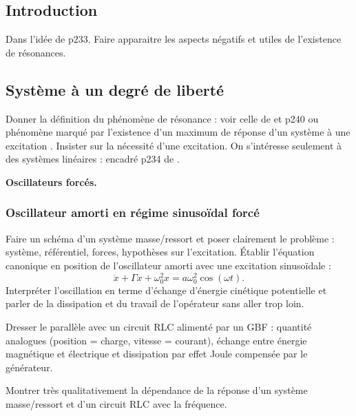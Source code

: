\subsection*{Introduction}

Dans l'idée de \cite{Michel2017} p233.
Faire apparaitre les aspects négatifs et utiles de l'existence de résonances.

\subsection{Système à un degré de liberté}

Donner la définition du phénomène de résonance : voir celle de \cite{Taillet2018} et \cite{Michel2017} p240 ou \og phénomène marqué par l'existence d'un maximum de réponse d'un système à une excitation \fg{}.
Insister sur la nécessité d'une excitation.
On s'intéresse seulement à des systèmes linéaires : encadré p234 de \cite{Michel2017}.

\begin{slide}
\textbf{Oscillateurs forcés.}
\end{slide}

\subsubsection{Oscillateur amorti en régime sinusoïdal forcé}

Faire un schéma d'un système masse/ressort et poser clairement le problème : système, référentiel, forces, hypothèses sur l'excitation.
Établir l'équation canonique en position de l'oscillateur amorti avec une excitation sinusoïdale :
\begin{equation}
\ddot{x} + \Gamma \dot{x} + \omega_0^2 x = a \omega_0^2 \cos(\omega t).
\label{eq:lp24_osc}
\end{equation}
Interpréter l'oscillation en terme d'échange d'énergie cinétique potentielle et parler de la dissipation et du travail de l'opérateur sans aller trop loin.

Dresser le parallèle avec un circuit RLC alimenté par un GBF : quantité analogues (position = charge, vitesse = courant), échange entre énergie magnétique et électrique et dissipation par effet Joule compensée par le générateur.

\begin{experience}
Montrer très qualitativement la dépendance de la réponse d'un système masse/ressort et d'un circuit RLC avec la fréquence. 
\end{experience}

